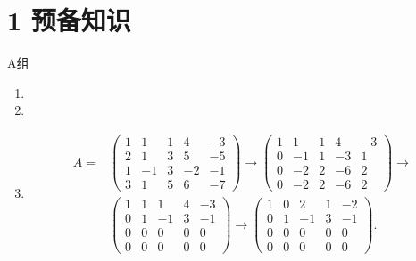 \section*{1 预备知识}

\vspace{2ex}

\centerline{\heiti A组}
\begin{enumerate}
    \item

    \item

    \item \begin{align*}
              A ={} &
              \begin{pmatrix}
                  1 & 1  & 1 & 4  & -3 \\
                  2 & 1  & 3 & 5  & -5 \\
                  1 & -1 & 3 & -2 & -1 \\
                  3 & 1  & 5 & 6  & -7
              \end{pmatrix}
              \rightarrow
              \begin{pmatrix}
                  1 & 1  & 1 & 4  & -3 \\
                  0 & -1 & 1 & -3 & 1  \\
                  0 & -2 & 2 & -6 & 2  \\
                  0 & -2 & 2 & -6 & 2
              \end{pmatrix} \rightarrow \\
                    &
              \begin{pmatrix}
                  1 & 1 & 1  & 4 & -3 \\
                  0 & 1 & -1 & 3 & -1 \\
                  0 & 0 & 0  & 0 & 0  \\
                  0 & 0 & 0  & 0 & 0
              \end{pmatrix}
              \rightarrow
              \begin{pmatrix}
                  1 & 0 & 2  & 1 & -2 \\
                  0 & 1 & -1 & 3 & -1 \\
                  0 & 0 & 0  & 0 & 0  \\
                  0 & 0 & 0  & 0 & 0
              \end{pmatrix}.
          \end{align*}

\end{enumerate}
